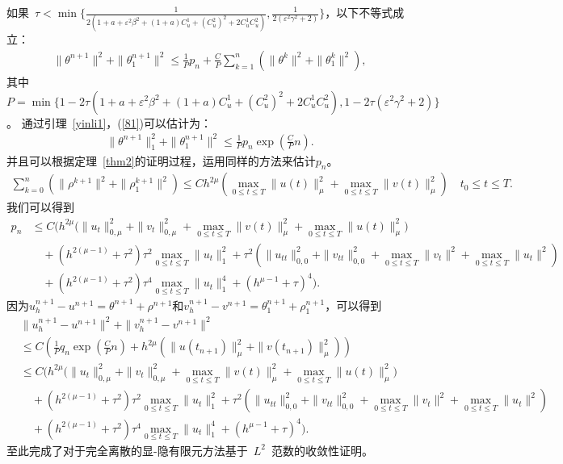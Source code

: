 \documentclass[twoside,UTF8]{nputhesis}
\begin{document}
如果~$\tau<\min\{\frac{1}{2(1+a+\varepsilon^2\beta^2+(1+a)C_u^1+(C_u^2)^2+2C_u^1C_u^2)},\frac{1}{2(\varepsilon^2\gamma^2+2)}\}$，以下不等式成立：
\begin{equation}
\begin{split}
\|\theta^{n+1}\|^2+\| \theta^{n+1}_1\|^2\leq \frac{1}{P}p_n+\frac{C}{P}\sum^n_{k=1}(\| \theta^k\|^2+\| \theta_1^k\|^2),
\label{81}
\end{split}
\end{equation}
其中$P=\min\{1-2\tau(1+a+\varepsilon^2\beta^2+(1+a)C_u^1+(C_u^2)^2+2C_u^1C_u^2),1-2\tau(\varepsilon^2\gamma^2+2)\}$。
通过引理~\ref{yinli1}，(\ref{81})可以估计为：
\begin{equation*}
\begin{split}
\| \theta^{n+1}\|^2_1+\| \theta^{n+1}_1\|^2\leq \frac{1}{P}p_n\exp\left(\frac{C}{P}n\right).
\label{82}
\end{split}
\end{equation*}
并且可以根据定理~\ref{thm2}的证明过程，运用同样的方法来估计$p_n$。
\begin{equation*}
\begin{split}
\sum^n_{k=0}(\| \rho^{k+1}\|^2+\|\rho_1^{k+1}\|^2)\leq Ch^{2\mu}(\max\limits_{0\leq t\leq T}\| u(t)\|^2_\mu+\max\limits_{0\leq t\leq T}\| v(t)\|^2_\mu)\quad t_0\leq t\leq T.
\label{85}
\end{split}
\end{equation*}
我们可以得到
\begin{equation*}
\begin{split}
p_n&\leq C\Big(h^{2\mu}\big( \| u_t\|^2_{0,\mu}+\| v_t\|^2_{0,\mu}+\max_{0\leq t\leq T}\| v(t)\|^2_\mu+\max_{0\leq t\leq T}\| u(t)\|^2_{\mu}\big)\\
&\quad+(h^{2(\mu-1)}+\tau^2)\tau^2\max_{0\leq t\leq T}\| u_t\|^2_1+\tau^2(\| u_{tt}\|^2_{0,0}+\| v_{tt}\|^2_{0,0}+\max_{0\leq t\leq T}\| v_t\|^2+\max_{0\leq t\leq T}\| u_t\|^2)\\
&\quad+(h^{2(\mu-1)}+\tau^2)\tau^4\max_{0\leq t\leq T}\| u_t\|^4_1+(h^{\mu-1}+\tau)^4\Big).
\label{89}
\end{split}
\end{equation*}
因为$u^{n+1}_h-u^{n+1}=\theta^{n+1}+\rho^{n+1}$和$v^{n+1}_h-v^{n+1}=\theta^{n+1}_1+\rho^{n+1}_1$，可以得到
\begin{equation*}
\begin{split}
&\|u^{n+1}_h-u^{n+1}\|^2+\| v^{n+1}_h-v^{n+1}\|^2\\
&\leq C\left(\frac{1}{P}q_n\exp(\frac{C}{P}n)+h^{2\mu}(\| u(t_{n+1})\|^2_\mu+\| v(t_{n+1})\|^2_\mu)\right)\\
&\leq C\Big(h^{2\mu}\big( \| u_t\|^2_{0,\mu}+\| v_t\|^2_{0,\mu}+\max_{0\leq t\leq T}\| v(t)\|^2_\mu+\max_{0\leq t\leq T}\| u(t)\|^2_{\mu}\big)\\
&\quad+(h^{2(\mu-1)}+\tau^2)\tau^2\max_{0\leq t\leq T}\| u_t\|^2_1+\tau^2(\| u_{tt}\|^2_{0,0}+\| v_{tt}\|^2_{0,0}+\max_{0\leq t\leq T}\| v_t\|^2+\max_{0\leq t\leq T}\| u_t\|^2)\\
&\quad+(h^{2(\mu-1)}+\tau^2)\tau^4\max_{0\leq t\leq T}\| u_t\|^4_1+(h^{\mu-1}+\tau)^4\Big).
\label{90}
\end{split}
\end{equation*}
至此完成了对于完全离散的显-隐有限元方法基于~$L^2$~范数的收敛性证明。
\end{document}
